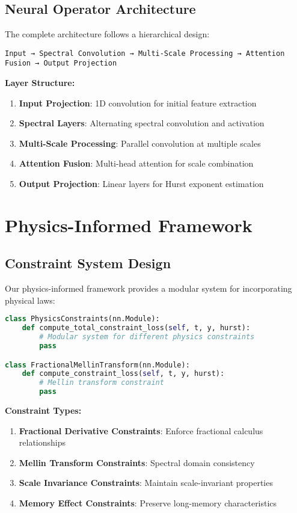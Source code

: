 \documentclass[11pt,a4paper]{article}
\begin{document}
\subsection{Neural Operator Architecture}

The complete architecture follows a hierarchical design:

\begin{center}
\texttt{Input → Spectral Convolution → Multi-Scale Processing → Attention Fusion → Output Projection}
\end{center}

\textbf{Layer Structure:}
\begin{enumerate}
    \item \textbf{Input Projection}: 1D convolution for initial feature extraction
    \item \textbf{Spectral Layers}: Alternating spectral convolution and activation
    \item \textbf{Multi-Scale Processing}: Parallel convolution at multiple scales
    \item \textbf{Attention Fusion}: Multi-head attention for scale combination
    \item \textbf{Output Projection}: Linear layers for Hurst exponent estimation
\end{enumerate}

\section{Physics-Informed Framework}

\subsection{Constraint System Design}

Our physics-informed framework provides a modular system for incorporating physical laws:

\begin{lstlisting}[language=Python, caption=Physics Constraint System]
class PhysicsConstraints(nn.Module):
    def compute_total_constraint_loss(self, t, y, hurst):
        # Modular system for different physics constraints
        pass

class FractionalMellinTransform(nn.Module):
    def compute_constraint_loss(self, t, y, hurst):
        # Mellin transform constraint
        pass
\end{lstlisting}

\textbf{Constraint Types:}
\begin{enumerate}
    \item \textbf{Fractional Derivative Constraints}: Enforce fractional calculus relationships
    \item \textbf{Mellin Transform Constraints}: Spectral domain consistency
    \item \textbf{Scale Invariance Constraints}: Maintain scale-invariant properties
    \item \textbf{Memory Effect Constraints}: Preserve long-memory characteristics
\end{enumerate}
\end{document}
